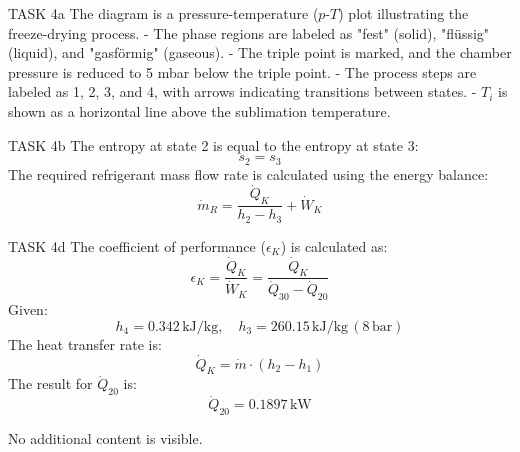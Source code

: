 TASK 4a  
The diagram is a pressure-temperature (\(p\)-\(T\)) plot illustrating the freeze-drying process.  
- The phase regions are labeled as "fest" (solid), "flüssig" (liquid), and "gasförmig" (gaseous).  
- The triple point is marked, and the chamber pressure is reduced to 5 mbar below the triple point.  
- The process steps are labeled as 1, 2, 3, and 4, with arrows indicating transitions between states.  
- \(T_i\) is shown as a horizontal line above the sublimation temperature.  

TASK 4b  
The entropy at state 2 is equal to the entropy at state 3:  
\[
s_2 = s_3
\]  
The required refrigerant mass flow rate is calculated using the energy balance:  
\[
\dot{m}_R = \frac{\dot{Q}_K}{h_2 - h_3} + \dot{W}_K
\]  

TASK 4d  
The coefficient of performance (\(\epsilon_K\)) is calculated as:  
\[
\epsilon_K = \frac{\dot{Q}_K}{\dot{W}_K} = \frac{\dot{Q}_K}{\dot{Q}_{30} - \dot{Q}_{20}}
\]  
Given:  
\[
h_4 = 0.342 \, \text{kJ/kg}, \quad h_3 = 260.15 \, \text{kJ/kg} \, (8 \, \text{bar})
\]  
The heat transfer rate is:  
\[
\dot{Q}_K = \dot{m} \cdot (h_2 - h_1)
\]  
The result for \(\dot{Q}_{20}\) is:  
\[
\dot{Q}_{20} = 0.1897 \, \text{kW}
\]  

No additional content is visible.